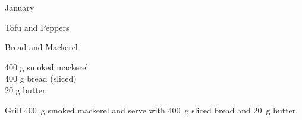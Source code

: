 \begin{menu}{January}
\begin{recipe}{2}{Tofu and Peppers}
\begin{instructions}
    \end{instructions}
    \end{recipe}%
  
    \begin{recipe}{1}{Bread and Mackerel}%
		\begin{ingredients}
		400 g smoked mackerel  \\
	400 g bread (sliced) \\
	20 g butter  \\
	
		\end{ingredients}
	
	
    \begin{instructions}
    \item 
        Grill
        400~g  smoked mackerel
        and serve with
        400~g sliced bread
        and
        20~g  butter.
      
    \end{instructions}
    \end{recipe}%
  
    \clearpage
    \end{menu}
	
